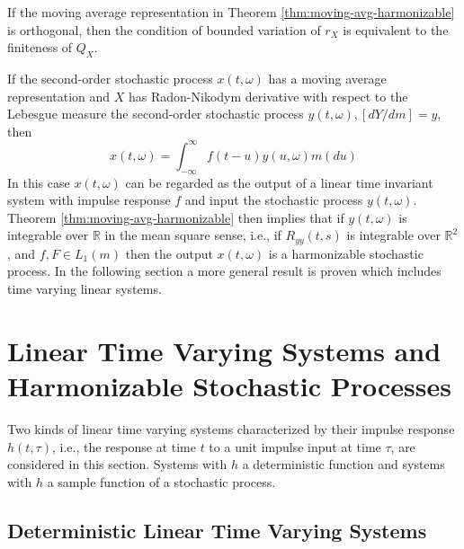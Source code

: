 \documentclass{article}
\begin{document}
If the moving average representation in Theorem
\ref{thm:moving-avg-harmonizable} is orthogonal, then the condition of bounded
variation of $r_X$ is equivalent to the finiteness of $Q_X$.

If the second-order stochastic process $x (t, \omega)$ has a moving average
representation and $X$ has Radon-Nikodym derivative with respect to the
Lebesgue measure the second-order stochastic process $y (t, \omega), [dY / dm]
= y$, then
\begin{equation}
  x (t, \omega) = \int_{- \infty}^{\infty} f (t - u) y (u, \omega) m (du)
  \label{eq:x-conv}
\end{equation}
In this case $x (t, \omega)$ can be regarded as the output of a linear time
invariant system with impulse response $f$ and input the stochastic process $y
(t, \omega)$. Theorem \ref{thm:moving-avg-harmonizable} then implies that if
$y (t, \omega)$ is integrable over $\mathbb{R}$ in the mean square sense,
i.e., if $R_{yy} (t, s)$ is integrable over $\mathbb{R}^2$, and $f, F \in L_1
(m)$ then the output $x (t, \omega)$ is a harmonizable stochastic process. In
the following section a more general result is proven which includes time
varying linear systems.

\section{Linear Time Varying Systems and Harmonizable Stochastic
Processes}\label{sec:linear-systems}

Two kinds of linear time varying systems characterized by their impulse
response $h (t, \tau)$, i.e., the response at time $t$ to a unit impulse input
at time $\tau$, are considered in this section. Systems with $h$ a
deterministic function and systems with $h$ a sample function of a stochastic
process.

\subsection{Deterministic Linear Time Varying
Systems}\label{subsec:deterministic}
\end{document}
